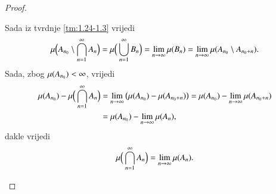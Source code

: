 \begin{proof}
\begin{enumerate}[label={(\roman*)}]
\begin{equation*}
            \end{equation*}
            Sada iz tvrdnje \ref{tm:1.24-1.3} vrijedi
            \begin{equation*}
                \mu \Big( A_{n_0} \setminus
            \bigcap\limits_{n=1}^{\infty} A_n \Big) = \mu \Big( \bigcup\limits_{n=1}^{\infty} B_n \Big)
            = \lim\limits_{n \to \infty} \mu({B_n}) = \lim\limits_{n \to \infty} \mu({A_{n_0} \setminus
            A_{n_0+n}}).
            \end{equation*}
            Sada, zbog $\mu({A_{n_0}}) < \infty$, vrijedi
            \begin{equation*}
                \begin{aligned}
                    \mu({A_{n_0}}) - \mu \Big( \bigcap\limits_{n=1}^{\infty} A_n \Big) &= \lim\limits_{n \to \infty} \big( \mu({A_{n_0}}) - \mu({A_{n_0+n}}) \big) = \mu({A_{n_0}}) - \lim\limits_{n \to \infty} \mu({A_{n_0+n}})\\
                    &= \mu({A_{n_0}}) - \lim\limits_{n \to \infty} \mu({A_n}),
                \end{aligned}
            \end{equation*}
            dakle vrijedi
            \begin{equation*}
                \mu \Big( \bigcap\limits_{n=1}^{\infty} A_n \Big) = \lim\limits_{n \to \infty} \mu({A_n}).
            \end{equation*}
    \end{enumerate}
\end{proof}
